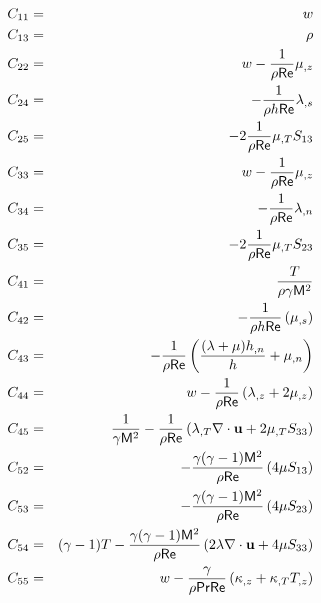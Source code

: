 \pagebreak
{}
%
\begin{eqnarray} 
  C_{11} &=& w \\
  C_{13} &=& \rho \\
%
  C_{22} &=&  w - \fact\mu_{,z}  \\
  C_{24} &=& -\facth\lambda_{,s}\\
  C_{25} &=& -2\fact\dmu S_{13} \\
%
  C_{33} &=&  w - \fact\mu_{,z} \\
  C_{34} &=& -\fact\lambda_{,n} \\
  C_{35} &=& -2\fact\dmu S_{23} \\
%
  C_{41} &=& \frac{T}{\rho\gamma \M^2} \\
  C_{42} &=& -\facth\left(\mu_{,s}\right) \\
  C_{43} &=& -\fact\left( \frac{(\lambda + \mu)\hn}{h} + \mu_{,n}\right) \\
  C_{44} &=&  w - \fact\left(\lambda_{,z} + 2\mu_{,z}\right) \\
  C_{45} &=& \frac{1}{\gamma \M^2} - 
             \fact\left(\dlm \divu + 2\dmu S_{33} \right ) \\
%
  C_{52} &=& -\ff\left(4\mu S_{13}\right) \\
  C_{53} &=& -\ff\left(4\mu S_{23}\right) \\
  C_{54} &=& \gammam T - \ff\left(2\lambda\divu + 4\mu S_{33}\right) \\
  C_{55} &=& w - 
             \frac{\gamma}{\rho\Pr\Re}\left( \kappa_{,z} + 
             \dcon T_{,z} \right)
\end{eqnarray}

